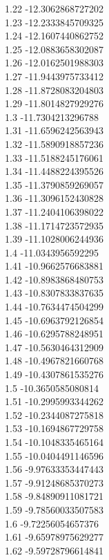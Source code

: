 {1.22	-12.3062868727202\\
1.23	-12.2333845709325\\
1.24	-12.1607440862752\\
1.25	-12.0883658302087\\
1.26	-12.0162501988303\\
1.27	-11.9443975733412\\
1.28	-11.8728083204803\\
1.29	-11.8014827929276\\
1.3	-11.7304213296788\\
1.31	-11.6596242563943\\
1.32	-11.5890918857236\\
1.33	-11.5188245176061\\
1.34	-11.4488224395526\\
1.35	-11.3790859269057\\
1.36	-11.3096152430828\\
1.37	-11.2404106398022\\
1.38	-11.1714723572935\\
1.39	-11.1028006244936\\
1.4	-11.0343956592295\\
1.41	-10.9662576683881\\
1.42	-10.8983868480753\\
1.43	-10.8307833837635\\
1.44	-10.7634474504299\\
1.45	-10.6963792126854\\
1.46	-10.6295788248951\\
1.47	-10.5630464312909\\
1.48	-10.4967821660768\\
1.49	-10.4307861535276\\
1.5	-10.3650585080814\\
1.51	-10.2995993344262\\
1.52	-10.2344087275818\\
1.53	-10.1694867729758\\
1.54	-10.1048335465164\\
1.55	-10.0404491146596\\
1.56	-9.97633353447443\\
1.57	-9.91248685370273\\
1.58	-9.84890911081721\\
1.59	-9.78560033507583\\
1.6	-9.72256054657376\\
1.61	-9.65978975629277\\
1.62	-9.59728796614841\\
}

